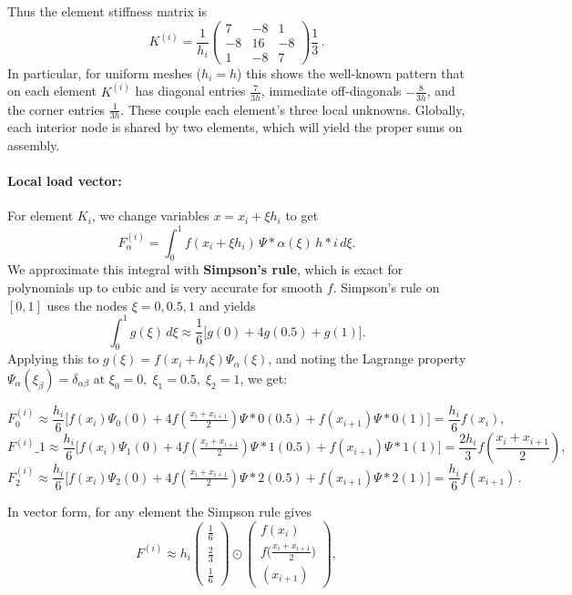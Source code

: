 \documentclass[a4paper,10pt]{article}
\begin{document}
Thus the element stiffness matrix is 
$$ 
K^{(i)} = \frac{1}{h_i}\begin{pmatrix} 7 & -8 & 1\\ -8 & 16 & -8\\ 1 & -8 & 7\end{pmatrix}\frac{1}{3}\,. 
$$
In particular, for uniform meshes ($h_i=h$) this shows the well-known pattern that on each element $K^{(i)}$ has diagonal entries $\frac{7}{3h}$, immediate off-diagonals $-\frac{8}{3h}$, and the corner entries $\frac{1}{3h}$. 
These couple each element's three local unknowns. 
Globally, each interior node is shared by two elements, which will yield the proper sums on assembly.

\paragraph{Local load vector:} For element $K_i$, we change variables $x = x_i + \xi h_i$ to get
$$ 
F^{(i)}_\alpha = \int_{0}^{1} f(x_i + \xi h_i)\,\Psi*\alpha(\xi)\,h*i\,d\xi. 
$$
We approximate this integral with \textbf{Simpson's rule}, which is exact for polynomials up to cubic and is very accurate for smooth $f$. 
Simpson's rule on $[0,1]$ uses the nodes $\xi=0,0.5,1$ and yields
$$ 
\int_{0}^{1} g(\xi)\,d\xi \approx \frac{1}{6}\Big[g(0)+4g(0.5)+g(1)\Big]. 
$$
Applying this to $g(\xi)=f(x_i+h_i\xi)\Psi_\alpha(\xi)$, and noting the Lagrange property $\Psi_\alpha(\xi_{\beta})=\delta_{\alpha\beta}$ at $\xi_0=0,\;\xi_1=0.5,\;\xi_2=1$, we get:

$$ 
F^{(i)}_0 \approx \frac{h_i}{6}\big[f(x_i)\Psi_0(0) + 4f(\tfrac{x_i+x_{i+1}}{2})\Psi*0(0.5)+f(x_{i+1})\Psi*0(1)\big] = \frac{h_i}{6} f(x_i), 
$$
$$ 
F^{(i)}\_1 \approx \frac{h_i}{6}\big[f(x_i)\Psi_1(0) + 4f(\tfrac{x_i+x_{i+1}}{2})\Psi*1(0.5)+f(x_{i+1})\Psi*1(1)\big] = \frac{2h_i}{3} f\!\left(\frac{x_i+x_{i+1}}{2}\right), 
$$
$$ 
F^{(i)}_2 \approx \frac{h_i}{6}\big[f(x_i)\Psi_2(0) + 4f(\tfrac{x_i+x_{i+1}}{2})\Psi*2(0.5)+f(x_{i+1})\Psi*2(1)\big] = \frac{h_i}{6} f(x_{i+1})\,.
$$

In vector form, for any element the Simpson rule gives
$$ 
F^{(i)} \approx h_i
\begin{pmatrix}
    \frac{1}{6}\\[1ex]\frac{2}{3}\\[1ex]
    \frac{1}{6}
\end{pmatrix} 
\odot
\begin{pmatrix} 
f(x_i)\\[1ex] 
f\!\big(\frac{x_i+x_{i+1}}{2}\big)\\[1ex]
(x_{i+1})
\end{pmatrix}, 
$$
\end{document}
